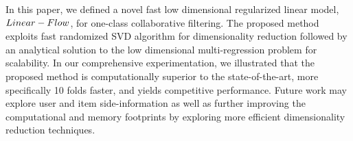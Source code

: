 
In this paper, we defined a novel fast low dimensional regularized linear model, $Linear-Flow$, for one-class collaborative filtering. The proposed method exploits fast randomized SVD algorithm for dimensionality reduction followed by an analytical solution to the low dimensional multi-regression problem for scalability. In our comprehensive experimentation, we illustrated that the proposed method is computationally superior to the state-of-the-art, more specifically 10 folds faster, and yields competitive performance. Future work may explore user and item side-information as well as further improving the computational and memory footprints by exploring more efficient dimensionality reduction techniques.